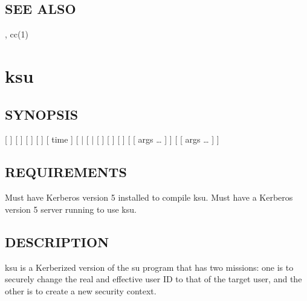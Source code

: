 \documentclass[letterpaper,10pt,english]{sphinxmanual}
\begin{document}
\subsection{SEE ALSO}
\label{\detokenize{user/user_commands/krb5-config:see-also}}
\sphinxAtStartPar
{\hyperref[\detokenize{user/user_config/kerberos:kerberos-7}]{}}, cc(1)


\section{ksu}
\label{\detokenize{user/user_commands/ksu:ksu}}\label{\detokenize{user/user_commands/ksu:ksu-1}}\label{\detokenize{user/user_commands/ksu::doc}}

\subsection{SYNOPSIS}
\label{\detokenize{user/user_commands/ksu:synopsis}}
\sphinxAtStartPar
{}
{[}  {]}
{[}   {]}
{[}   {]}
{[}  {]}
{[}  time {]}
{[}  | \sphinxstylestrong{\sphinxhyphen{}P}{]}
{[}  | \sphinxstylestrong{\sphinxhyphen{}F}{]}
{[}   {]}
{[}  {]}
{[}  {]}
{[}   {[} args …  {]} {]} {[}  {[} args …  {]} {]}


\subsection{REQUIREMENTS}
\label{\detokenize{user/user_commands/ksu:requirements}}
\sphinxAtStartPar
Must have Kerberos version 5 installed to compile ksu.  Must have a
Kerberos version 5 server running to use ksu.


\subsection{DESCRIPTION}
\label{\detokenize{user/user_commands/ksu:description}}
\sphinxAtStartPar
ksu is a Kerberized version of the su program that has two missions:
one is to securely change the real and effective user ID to that of
the target user, and the other is to create a new security context.
\end{document}

